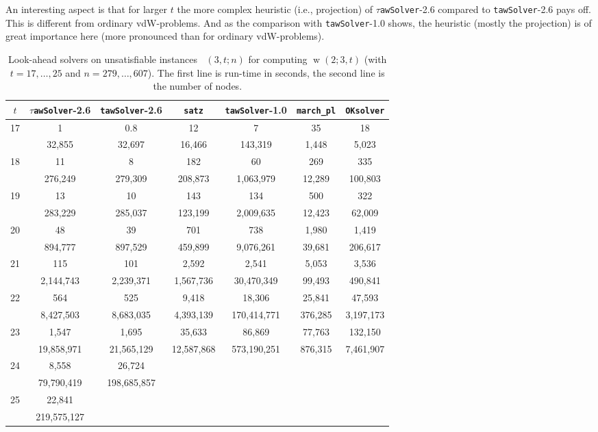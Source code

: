 \documentclass[final,3p,times]{elsarticle}
\theoremstyle{definition}
\newcommand{\tawsolver}{\texttt{tawSolver}}
\newcommand{\otawsolver}{\tawsolver-1.0}
\newcommand{\ntawsolver}{\tawsolver-2.6}
\newcommand{\ttawsolver}{$\tau$\texttt{awSolver}-2.6}
\newcommand{\oksolver}{\texttt{OKsolver}}
\newcommand{\satz}{\texttt{satz}}
\newcommand{\march}{\texttt{march\_pl}}
\DeclareMathOperator{\vdw}{w}
\DeclareMathOperator{\Fpd}{\mathit{F}^{pd}}
\begin{document}
An interesting aspect is that for larger $t$ the more complex heuristic (i.e., projection) of \ttawsolver{} compared to \ntawsolver{} pays off. This is different from ordinary vdW-problems. And as the comparison with \otawsolver{} shows, the heuristic (mostly the projection) is of great importance here (more pronounced than for ordinary vdW-problems).

\begin{table}[H]
  \centering
  \begin{tabular}{c||c|c|c|c|c|c}
    $t$ & \ttawsolver & \ntawsolver & \satz & \otawsolver &   \march & \oksolver{}\\
    \hline\hline
    17 & 1 & 0.8 & 12 & 7 & 35 & 18\\
    & 32,855 & 32,697 & 16,466 & 143,319 & 1,448 & 5,023\\
    \hline
    18 & 11 & 8 & 182 & 60 & 269 & 335\\
    & 276,249 & 279,309 & 208,873 & 1,063,979 & 12,289 & 100,803\\
    \hline
    19 & 13 & 10 & 143 & 134 & 500 & 322\\
    & 283,229 & 285,037 & 123,199 & 2,009,635 & 12,423 & 62,009\\
    \hline
    20 & 48 & 39 & 701 & 738 & 1,980 & 1,419\\
    & 894,777 & 897,529 & 459,899 & 9,076,261 & 39,681 & 206,617\\
    \hline
    21 & 115 & 101 & 2,592 & 2,541 & 5,053 & 3,536\\
    & 2,144,743 & 2,239,371 & 1,567,736 & 30,470,349 & 99,493 & 490,841\\
    \hline
    22 & 564 & 525 & 9,418 & 18,306 & 25,841 & 47,593\\
    & 8,427,503 & 8,683,035 & 4,393,139 & 170,414,771 & 376,285 & 3,197,173\\
    \hline
    23 & 1,547 & 1,695 & 35,633 & 86,869 & 77,763 & 132,150\\
    & 19,858,971 & 21,565,129 & 12,587,868 & 573,190,251 & 876,315 & 7,461,907\\
    \hline
    24 & 8,558 & 26,724\\
    & 79,790,419 & 198,685,857\\
    \hline
    25 & 22,841\\
    & 219,575,127
  \end{tabular}
  \caption{Look-ahead solvers on unsatisfiable instances $\Fpd(3,t;n)$ for computing $\vdw(2;3,t)$ (with $t=17,\dots,25$ and $n=279, \dots, 607$). The first line is run-time in seconds, the second line is the number of nodes.}
  \label{tab:pdvdwlasolvers}
\end{table}
\end{document}

